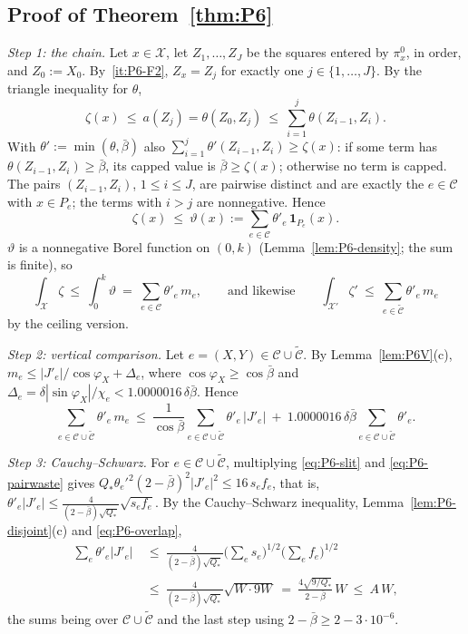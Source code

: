\documentclass[11pt]{amsart}
\newcommand{\cX}{\mathcal X}
\newcommand{\bbar}{\bar\beta}
\theoremstyle{definition}
\theoremstyle{remark}
\numberwithin{equation}{section}
\begin{document}
\subsection{Proof of Theorem~\ref{thm:P6}}\label{ssec:P6-proof}

\emph{Step 1: the chain.} Let $x\in\cX$, let $Z_1,\dots,Z_J$ be the squares entered by $\pi^0_x$, in order, and
$Z_0:=X_0$. By~\ref{it:P6-F2}, $Z_x=Z_j$ for exactly one $j\in\{1,\dots,J\}$. By the triangle inequality for $\theta$,
\[
\zeta(x)\ \le\ a(Z_j)=\theta(Z_0,Z_j)\ \le\ \sum_{i=1}^j\theta(Z_{i-1},Z_i).
\]
With $\theta':=\min(\theta,\bbar)$ also $\sum_{i=1}^j\theta'(Z_{i-1},Z_i)\ge\zeta(x)$: if some term has
$\theta(Z_{i-1},Z_i)\ge\bbar$, its capped value is $\bbar\ge\zeta(x)$; otherwise no term is capped. The pairs
$(Z_{i-1},Z_i)$, $1\le i\le J$, are pairwise distinct and are exactly the $e\in\mathcal C$ with $x\in P_e$; the terms
with $i>j$ are nonnegative. Hence
\[
\zeta(x)\ \le\ \vartheta(x):=\sum_{e\in\mathcal C}\theta'_e\,\mathbf 1_{P_e}(x).
\]
$\vartheta$ is a nonnegative Borel function on $(0,k)$ (Lemma~\ref{lem:P6-density}; the sum is finite), so
\begin{equation}\label{eq:P6-chain}
\int_{\cX}\zeta\ \le\ \int_0^k\vartheta\ =\ \sum_{e\in\mathcal C}\theta'_e\,m_e ,\qquad\text{and likewise}\qquad
\int_{\cX'}\zeta'\ \le\ \sum_{e\in\tilde{\mathcal C}}\theta'_e\,m_e
\end{equation}
by the ceiling version.

\emph{Step 2: vertical comparison.} Let $e=(X,Y)\in\mathcal C\cup\tilde{\mathcal C}$. By Lemma~\ref{lem:P6V}(c),
$m_e\le|J'_e|/\cos\varphi_X+\Delta_e$, where $\cos\varphi_X\ge\cos\bbar$ and
$\Delta_e=\delta|\sin\varphi_X|/\chi_e<1.0000016\,\delta\bbar$. Hence
\begin{equation}\label{eq:P6-comparison}
\sum_{e\in\mathcal C\cup\tilde{\mathcal C}}\theta'_e\,m_e\ \le\ \frac1{\cos\bbar}\sum_{e\in\mathcal C\cup\tilde{\mathcal C}}\theta'_e\,|J'_e|
\ +\ 1.0000016\,\delta\bbar\sum_{e\in\mathcal C\cup\tilde{\mathcal C}}\theta'_e .
\end{equation}

\emph{Step 3: Cauchy--Schwarz.} For $e\in\mathcal C\cup\tilde{\mathcal C}$, multiplying \eqref{eq:P6-slit} and
\eqref{eq:P6-pairwaste} gives $Q_*\theta_e'^2(2-\bbar)^2|J'_e|^2\le16\,s_ef_e$, that is,
$\theta'_e|J'_e|\le\frac{4}{(2-\bbar)\sqrt{Q_*}}\sqrt{s_ef_e}$. By the Cauchy--Schwarz inequality,
Lemma~\ref{lem:P6-disjoint}(c) and \eqref{eq:P6-overlap},
\[
\begin{aligned}
\sum_{e}\theta'_e|J'_e|\ &\le\ \frac{4}{(2-\bbar)\sqrt{Q_*}}\Big(\sum_es_e\Big)^{1/2}\Big(\sum_ef_e\Big)^{1/2}\\
&\le\ \frac{4}{(2-\bbar)\sqrt{Q_*}}\sqrt{W\cdot9W}\ =\ \frac{4\sqrt{9/Q_*}}{2-\bbar}\,W\ \le\ A\,W,
\end{aligned}
\]
the sums being over $\mathcal C\cup\tilde{\mathcal C}$ and the last step using $2-\bbar\ge2-3\cdot10^{-6}$.
\end{document}
